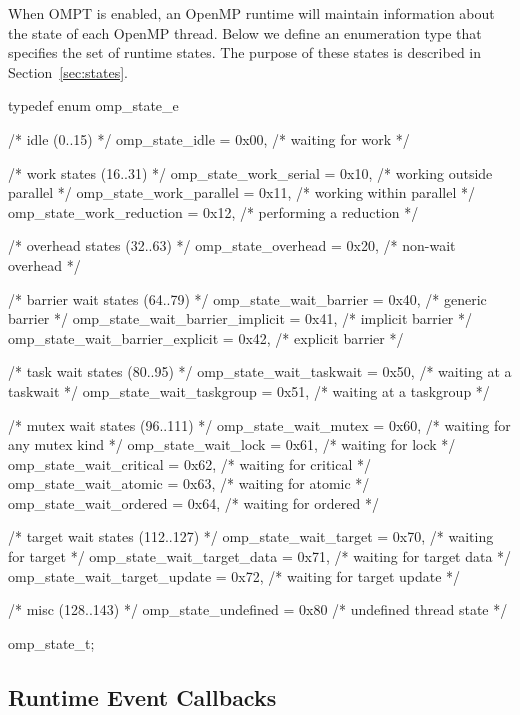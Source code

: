 \documentclass{article}
\begin{document}
When OMPT is enabled, an OpenMP runtime will maintain information about the state of  each OpenMP thread. 
Below we define an enumeration type that specifies the set of runtime states. 
The purpose of these states is described in Section~\ref{sec:states}.

\begin{boxedcode}
typedef enum omp\_state\_e {
  /* idle (0..15) */
  omp\_state\_idle                   = 0x00, /* waiting for work           */

  /* work states (16..31) */
  omp\_state\_work\_serial            = 0x10, /* working outside parallel   */
  omp\_state\_work\_parallel          = 0x11, /* working within parallel    */
  omp\_state\_work\_reduction         = 0x12, /* performing a reduction     */

  /* overhead states (32..63) */
  omp\_state\_overhead               = 0x20, /* non-wait overhead          */

  /* barrier wait states (64..79) */
  omp\_state\_wait\_barrier           = 0x40, /* generic barrier            */
  omp\_state\_wait\_barrier\_implicit  = 0x41, /* implicit barrier           */
  omp\_state\_wait\_barrier\_explicit  = 0x42, /* explicit barrier           */
    
  /* task wait states (80..95) */
  omp\_state\_wait\_taskwait          = 0x50, /* waiting at a taskwait      */
  omp\_state\_wait\_taskgroup         = 0x51, /* waiting at a taskgroup     */

  /* mutex wait states (96..111) */
  omp\_state\_wait\_mutex             = 0x60, /* waiting for any mutex kind */
  omp\_state\_wait\_lock              = 0x61, /* waiting for lock           */
  omp\_state\_wait\_critical          = 0x62, /* waiting for critical       */
  omp\_state\_wait\_atomic            = 0x63, /* waiting for atomic         */
  omp\_state\_wait\_ordered           = 0x64, /* waiting for ordered        */
  
  /* target wait states (112..127) */
  omp\_state\_wait\_target            = 0x70, /* waiting for target         */ 
  omp\_state\_wait\_target\_data       = 0x71, /* waiting for target data    */ 
  omp\_state\_wait\_target\_update     = 0x72, /* waiting for target update  */ 

  /* misc (128..143) */
  omp\_state\_undefined              = 0x80  /* undefined thread state     */
} omp\_state\_t;
\end{boxedcode}
\clearpage
\subsection{Runtime Event Callbacks}
\label{appendix:ompt-types:events}
\end{document}
